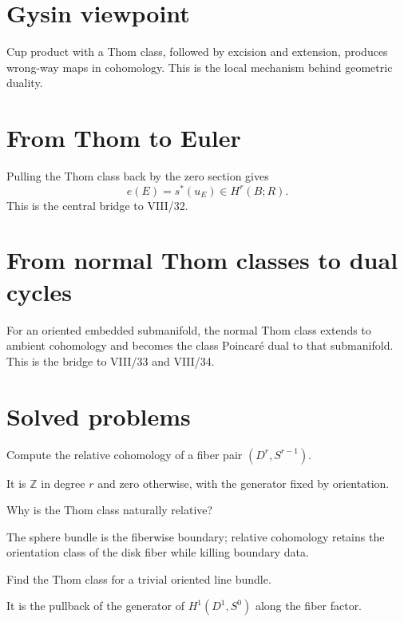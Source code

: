 \section{Gysin viewpoint}
Cup product with a Thom class, followed by excision and extension, produces
wrong-way maps in cohomology.  This is the local mechanism behind geometric
duality.

\section{From Thom to Euler}
Pulling the Thom class back by the zero section gives
\[
e(E)=s^*(u_E)\in H^r(B;R).
\]
This is the central bridge to VIII/32.

\section{From normal Thom classes to dual cycles}
For an oriented embedded submanifold, the normal Thom class extends to ambient
cohomology and becomes the class Poincaré dual to that submanifold.  This is
the bridge to VIII/33 and VIII/34.

\section{Solved problems}
\begin{problem}
Compute the relative cohomology of a fiber pair $(D^r,S^{r-1})$.
\end{problem}
\begin{solution}
It is $\mathbb Z$ in degree $r$ and zero otherwise, with the generator fixed by orientation.
\end{solution}

\begin{problem}
Why is the Thom class naturally relative?
\end{problem}
\begin{solution}
The sphere bundle is the fiberwise boundary; relative cohomology retains the orientation class of the disk fiber while killing boundary data.
\end{solution}

\begin{problem}
Find the Thom class for a trivial oriented line bundle.
\end{problem}
\begin{solution}
It is the pullback of the generator of $H^1(D^1,S^0)$ along the fiber factor.
\end{solution}


